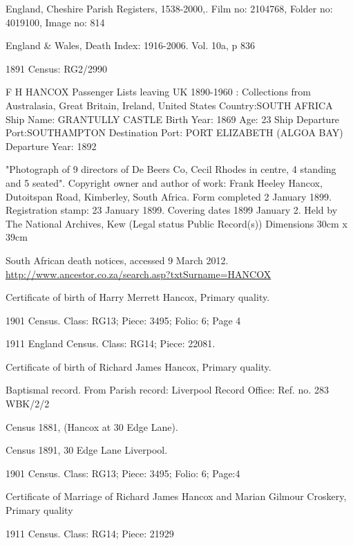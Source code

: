 \begin{thebibliography}{99}
{
	England, Cheshire Parish Registers, 1538-2000,.
	Film no: 2104768, Folder no: 4019100, Image no: 814
	
	England & Wales, Death Index: 1916-2006.
	Vol. 10a, p 836
	
	 1891 Census: RG2/2990
	 
	F H HANCOX 
   	Passenger Lists leaving UK 1890-1960 : Collections from Australasia, Great Britain, Ireland, United States
	Country:SOUTH AFRICA
	Ship Name: GRANTULLY CASTLE
	Birth Year: 1869  Age: 23
	Ship Departure Port:SOUTHAMPTON
	Destination Port: PORT ELIZABETH (ALGOA BAY)
	Departure Year: 1892
	
	"Photograph of 9 directors of De Beers Co, Cecil Rhodes in centre, 4 standing and 5 seated".
	Copyright owner and author of work: Frank Heeley Hancox, Dutoitspan Road, Kimberley, South Africa.
	Form completed 2 January 1899. Registration stamp: 23 January 1899.
	Covering dates 1899 January 2. Held by The National Archives, Kew (Legal status Public Record(s))
	Dimensions 30cm x 39cm

	South African death notices, accessed 9 March 2012.
	\url{http://www.ancestor.co.za/search.asp?txtSurname=HANCOX}
	
	Certificate of birth of Harry Merrett Hancox, Primary quality.
	
	1901 Census. Class: RG13; Piece: 3495; Folio: 6; Page 4
	
	1911 England Census. Class: RG14; Piece: 22081.
	
	Certificate of birth of Richard James Hancox, Primary quality.
	
	 Baptismal record. From Parish record: Liverpool Record Office: Ref. no. 283 WBK/2/2
	 
	Census 1881, (Hancox at 30 Edge Lane).
	
	Census 1891, 30 Edge Lane Liverpool.

	1901 Census. Class: RG13; Piece: 3495; Folio: 6; Page:4

	 Certificate of Marriage of Richard James Hancox and Marian Gilmour Croskery, Primary quality
	 
	1911 Census. Class: RG14; Piece: 21929
	
}
\end{thebibliography}
